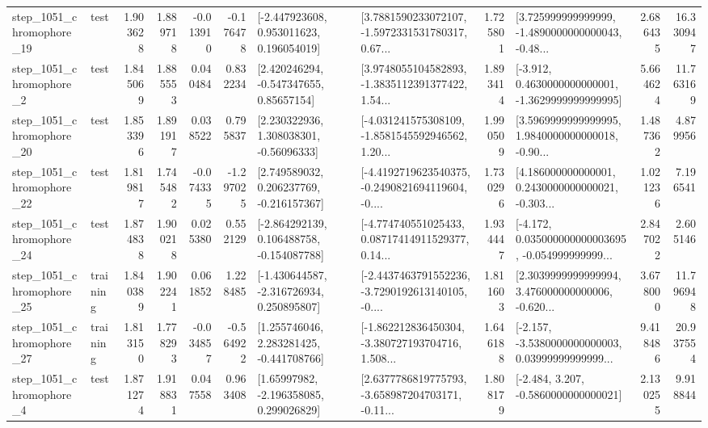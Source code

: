 \begin{tabular}{llrrrrllrlrr}
 step\_1051\_chromophore\_19 &      test &      1.903628 &    1.889718 &     -0.013910 & -0.176478 &    [-2.447923608, 0.953011623, 0.196054019] &  [3.7881590233072107, -1.5972331531780317, 0.67... &       1.725801 &  [3.725999999999999, -1.4890000000000043, -0.48... &            2.686435 &         16.330947 \\
  step\_1051\_chromophore\_2 &      test &      1.845069 &    1.885553 &      0.040484 &  0.832234 &     [2.420246294, -0.547347655, 0.85657154] &  [3.9748055104582893, -1.3835112391377422, 1.54... &       1.893414 &  [-3.912, 0.4630000000000001, -1.3629999999999995] &            5.664624 &         11.763169 \\
 step\_1051\_chromophore\_20 &      test &      1.853396 &    1.891917 &      0.038522 &  0.795837 &     [2.230322936, 1.308038301, -0.56096333] &  [-4.031241575308109, -1.8581545592946562, 1.20... &       1.990509 &  [3.5969999999999995, 1.9840000000000018, -0.90... &            1.487362 &          4.879956 \\
 step\_1051\_chromophore\_22 &      test &      1.819817 &    1.745482 &     -0.074335 & -1.297025 &    [2.749589032, 0.206237769, -0.216157367] &  [-4.4192719623540375, -0.2490821694119604, -0.... &       1.730296 &  [4.186000000000001, 0.2430000000000021, -0.303... &            1.021236 &          7.196541 \\
 step\_1051\_chromophore\_24 &      test &      1.874838 &    1.900218 &      0.025380 &  0.552129 &   [-2.864292139, 0.106488758, -0.154087788] &  [-4.774740551025433, 0.08717414911529377, 0.14... &       1.934447 &  [-4.172, 0.035000000000003695, -0.054999999999... &            2.847022 &          2.605146 \\
 step\_1051\_chromophore\_25 &  training &      1.840389 &    1.902241 &      0.061852 &  1.228485 &   [-1.430644587, -2.316726934, 0.250895807] &  [-2.4437463791552236, -3.7290192613140105, -0.... &       1.811603 &  [2.3039999999999994, 3.476000000000006, -0.620... &            3.678000 &         11.796948 \\
 step\_1051\_chromophore\_27 &  training &      1.813150 &    1.778293 &     -0.034857 & -0.564922 &    [1.255746046, 2.283281425, -0.441708766] &  [-1.862212836450304, -3.380727193704716, 1.508... &       1.646188 &  [-2.157, -3.5380000000000003, 0.03999999999999... &            9.418486 &         20.937554 \\
  step\_1051\_chromophore\_4 &      test &      1.871274 &    1.918831 &      0.047558 &  0.963408 &     [1.65997982, -2.196358085, 0.299026829] &  [2.6377786819775793, -3.658987204703171, -0.11... &       1.808179 &               [-2.484, 3.207, -0.5860000000000021] &            2.130255 &          9.918844 \\

\end{tabular}
